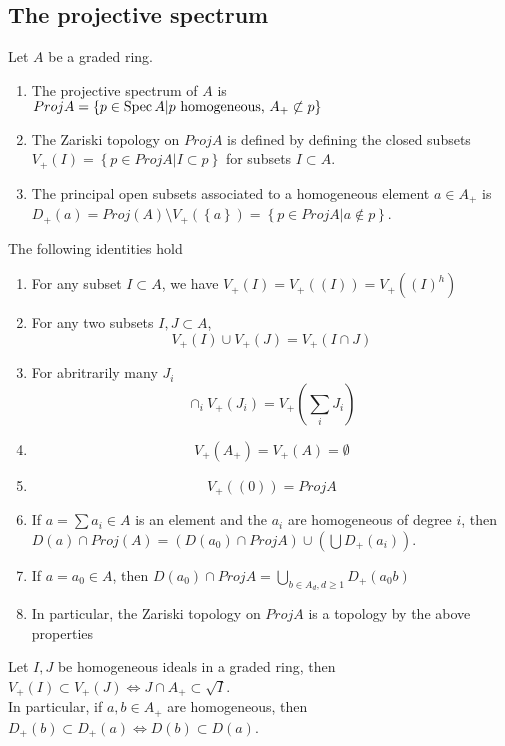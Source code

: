 \documentclass[../main.tex]{subfiles}
\begin{document}
\subsection{The projective spectrum}
\begin{defn}
	Let $A$ be a graded ring.
	\begin{enumerate}
	\item The projective spectrum of $A$ is $Proj A= \left\{ p \in \operatorname{Spec} A | p \text{ homogeneous, } A_+ \not \subset p \right\}$ 
	\item The Zariski topology on $Proj A$ is defined by defining the closed subsets $V_+( I) = \left\{ p \in Proj A| I \subset p \right\} $ for subsets $I \subset A$.
	\item The principal open subsets associated to a homogeneous element $a\in A_+$ is $D_+( a)= Proj( A) \setminus V_+( \left\{ a \right\} ) = \left\{ p \in Proj A | a \notin p \right\}  $.
	\end{enumerate}
\end{defn}
\begin{lemma}
The following identities hold
\begin{enumerate}
\item For any subset $I \subset A$, we have $V_+( I) = V_+( ( I) )= V_+( ( I)^{h})  $ 
\item For any two subsets $I,J \subset A$,
	\[ 
	V_+( I) \cup V_+( J) = V_+ ( I \cap J) 
	\]
	
\item For abritrarily many $J_i$ 
	\[ 
	\cap_i V_+( J_i) = V_+( \sum_i J_i) 
	\]
	
\item 
	\[ 
	V_+( A_+ )= V_+ ( A) = \emptyset
	\]
	
\item 
	\[ 
	V_+( ( 0) ) = Proj A
	\]

\item If $a= \sum a_i \in A$ is an element and the $a_i$ are homogeneous of degree $i$, then $D( a) \cap Proj( A) = ( D( a_0)\cap Proj A ) \cup ( \bigcup D_+( a_i) ) $.
\item If $a= a_0\in A$, then $D( a_0) \cap Proj A= \bigcup_{b \in A_d, d \geq 1} D_+( a_0b) $ 
\item In particular, the Zariski topology on $Proj A$ is a topology by the above properties
\end{enumerate}

\end{lemma}
\begin{lemma}
Let $I,J$ be homogeneous ideals in a graded ring, then $V_+( I) \subset V_+( J) \iff J \cap A_+ \subset \sqrt{I} $.\\
In particular, if $a,b \in A_+$ are homogeneous, then $D_+( b) \subset D_+( a) \iff D( b) \subset D( a) $.
\end{lemma}
\end{document}

